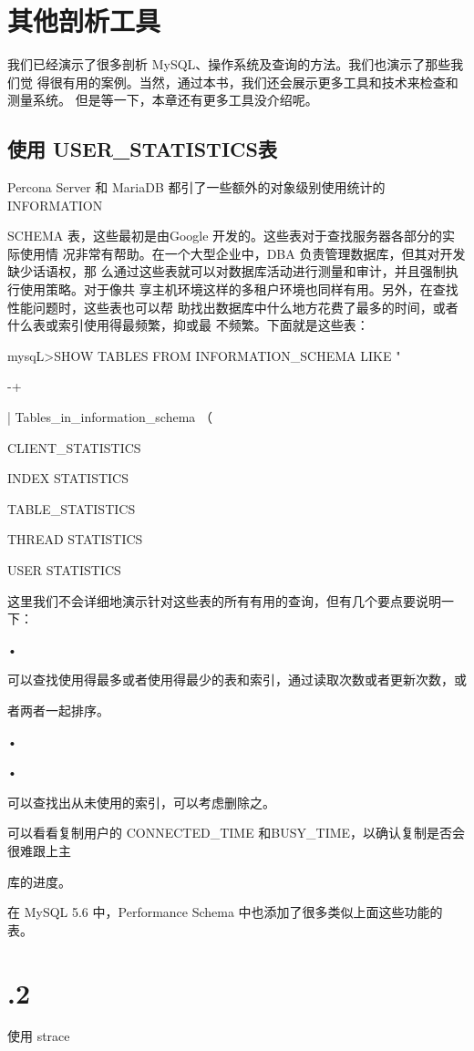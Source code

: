 {\section{其他剖析工具}
我们已经演示了很多剖析 MySQL、操作系统及查询的方法。我们也演示了那些我们觉
得很有用的案例。当然，通过本书，我们还会展示更多工具和技术来检查和测量系统。
但是等一下，本章还有更多工具没介绍呢。

\subsection{使用 USER\_STATISTICS表}
Percona Server 和 MariaDB 都引了一些额外的对象级别使用统计的 INFORMATION

SCHEMA 表，这些最初是由Google 开发的。这些表对于查找服务器各部分的实际使用情
况非常有帮助。在一个大型企业中，DBA 负责管理数据库，但其对开发缺少话语权，那
么通过这些表就可以对数据库活动进行测量和审计，并且强制执行使用策略。对于像共
享主机环境这样的多租户环境也同样有用。另外，在查找性能问题时，这些表也可以帮
助找出数据库中什么地方花费了最多的时间，或者什么表或索引使用得最频繁，抑或最
不频繁。下面就是这些表：

mysqL>SHOW TABLES FROM INFORMATION\_SCHEMA LIKE "%

-+

| Tables\_in\_information\_schema （%

CLIENT\_STATISTICS

INDEX STATISTICS

TABLE\_STATISTICS

THREAD STATISTICS

USER STATISTICS

这里我们不会详细地演示针对这些表的所有有用的查询，但有几个要点要说明一下：

•

可以查找使用得最多或者使用得最少的表和索引，通过读取次数或者更新次数，或

者两者一起排序。

•

•

可以查找出从未使用的索引，可以考虑删除之。

可以看看复制用户的 CONNECTED\_TIME 和BUSY\_TIME，以确认复制是否会很难跟上主

库的进度。

在 MySQL 5.6 中，Performance Schema 中也添加了很多类似上面这些功能的表。

\section{.2}
使用 strace

}
